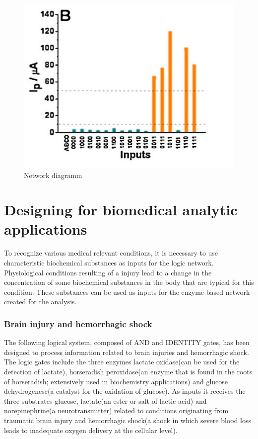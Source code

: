 \documentclass[runningheads]{llncs}
\begin{document}
		\begin{figure}[H] \centering \includegraphics[scale= 0.4]{pics/ph.png} \caption{Network diagramm} \label{img:ph} \end{figure}
	
	

\section{Designing for biomedical analytic applications}
	To recognize various medical relevant conditions, it is necessary to use characteristic biochemical substances as inputs for the logic network.
	Physiological conditions resulting of a injury lead to a change in the concentration of some biochemical substances in the body that are typical for this condition. These substances can be used as inputs for the enzyme-based network created for the analysis.
	
	
	\subsubsection{Brain injury and hemorrhagic shock}
	
	The following logical system, composed of AND and IDENTITY gates, has been designed to process information related to brain injuries and hemorrhagic shock.
	The logic gates include the three enzymes lactate oxidase(can be used for the detection of lactate), horseradish peroxidase(an enzyme that is found in the roots of horseradish; extensively used in biochemistry applications)\cite{horse} and glucose dehydrogenese(a catalyst for the oxidation of glucose)\cite{chemie}.
	As inputs it receives the three substrates glucose, lactate(an ester or salt of lactic acid) and norepinephrine(a neurotransmitter) related to conditions originating from traumatic brain injury and hemorrhagic shock(a shock in which severe blood loss leads to inadequate oxygen delivery at the cellular level)\cite{shock}.
	
\end{document}
